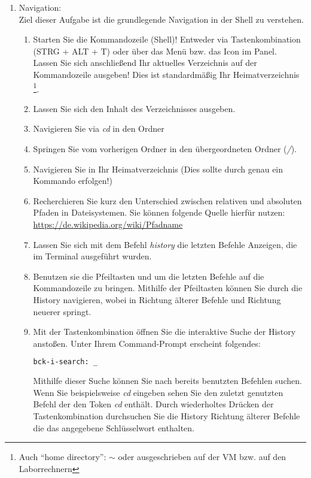 \documentclass[paper=a4,fontsize=11pt]{scrartcl}%
\numberwithin{equation}{section}
\begin{document}
\begin{enumerate}
\item Navigation:\\
Ziel dieser Aufgabe ist die grundlegende Navigation in der Shell zu verstehen.
\begin{enumerate}[label=(\alph*)]
		\item Starten Sie die Kommandozeile (Shell)! Entweder via Tastenkombination  (STRG + ALT + T) oder über das Menü bzw. das Icon im Panel.\\
		Lassen Sie sich anschließend Ihr aktuelles Verzeichnis auf der Kommandozeile ausgeben! Dies ist standardmäßig Ihr Heimatverzeichnis \footnote{Auch \enquote{home directory}: $\sim$ oder ausgeschrieben  auf der VM bzw.  auf den Laborrechnern}.
		\item Lassen Sie sich den Inhalt des Verzeichnisses ausgeben.
		\item Navigieren Sie via \emph{cd} in den Ordner 
		\item Springen Sie vom vorherigen Ordner in den übergeordneten Ordner (\emph{/}).
		\item Navigieren Sie in Ihr Heimatverzeichnis (Dies sollte durch genau ein Kommando erfolgen!)
		\item Recherchieren Sie kurz den Unterschied zwischen relativen und absoluten Pfaden in Dateisystemen. Sie können folgende Quelle hierfür nutzen: \url{https://de.wikipedia.org/wiki/Pfadname}
		\item Lassen Sie sich mit dem Befehl \emph{history} die letzten Befehle Anzeigen, die im Terminal ausgeführt wurden. 
		\item Benutzen sie die Pfeiltasten \keys{\arrowkeyup} und \keys{\arrowkeydown} um die letzten Befehle auf die Kommandozeile zu bringen. Mithilfe der Pfeiltasten können Sie durch die History navigieren, wobei \keys{\arrowkeyup} in Richtung älterer Befehle und \keys{\arrowkeydown} Richtung neuerer springt.
		\item Mit der Tastenkombination  öffnen Sie die interaktive Suche der History anstoßen. Unter Ihrem Command-Prompt erscheint folgendes:\\
		\begin{lstlisting}[style=Bash, language=Bash]
bck-i-search: _
		\end{lstlisting}
		Mithilfe dieser Suche können Sie nach bereits benutzten Befehlen suchen. Wenn Sie beispielsweise \emph{cd} eingeben sehen Sie den zuletzt genutzten Befehl der den Token \emph{cd} enthält. Durch wiederholtes Drücken der Tastenkombination  durchsuchen Sie die History Richtung älterer Befehle die das angegebene Schlüsselwort enthalten.\\

\end{enumerate}
\end{enumerate}
\end{document}
